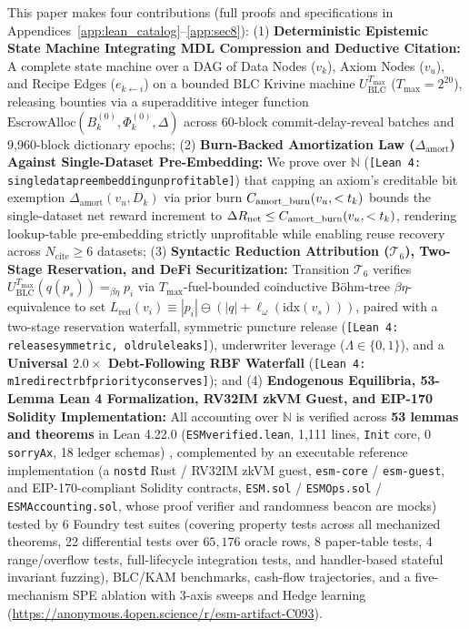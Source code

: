 \documentclass[runningheads,a4paper]{llncs}
\makeatletter
\renewcommand{\_}{\textunderscore\allowbreak}
\newcommand{\leanref}[1]{{\footnotesize\texttt{[Lean 4: #1]}}}
\renewcommand\subsection{\@startsection{subsection}{2}{\z@}{-13\p@ \@plus -4\p@ \@minus -4\p@}{5\p@ \@plus 2\p@ \@minus 2\p@}{\normalfont\normalsize\bfseries\boldmath\rightskip=\z@ \@plus 8em\pretolerance=10000 }}
\makeatother
\begin{document}
\subsection{Core Contributions}
This paper makes four contributions (full proofs and specifications in Appendices~\ref{app:lean_catalog}--\ref{app:sec8}): (1) \textbf{Deterministic Epistemic State Machine Integrating MDL Compression and Deductive Citation:} A complete state machine over a DAG of Data Nodes ($v_k$), Axiom Nodes ($v_u$), and Recipe Edges ($e_{k \leftarrow i}$) on a bounded BLC Krivine machine $U_{\text{BLC}}^{T_{\max}}$ ($T_{\max} = 2^{20}$), releasing bounties via a superadditive integer function $\text{EscrowAlloc}(B_k^{(0)},\allowbreak \Phi_k^{(0)},\allowbreak \Delta)$ across 60-block commit-delay-reveal batches and 9,960-block dictionary epochs; (2) \textbf{Burn-Backed Amortization Law ($\Delta_{\text{amort}}$) Against Single-Dataset Pre-Embedding:} We prove over $\mathbb{N}$ (\leanref{single\_data\_pre\_embedding\_unprofitable}) that capping an axiom's creditable bit exemption $\Delta_{\text{amort}}(v_u,\allowbreak D_k)$ via prior burn $C_{\text{amort\_burn}}(v_u,\allowbreak < t_k)$ bounds the single-dataset net reward increment to $\Delta R_{\text{net}} \le C_{\text{amort\_burn}}(v_u,\allowbreak < t_k)$, rendering lookup-table pre-embedding strictly unprofitable while enabling reuse recovery across $N_{\text{cite}} \ge 6$ datasets; (3) \textbf{Syntactic Reduction Attribution ($\mathcal{T}_6$), Two-Stage Reservation, and DeFi Securitization:} Transition $\mathcal{T}_6$ verifies $U_{\text{BLC}}^{T_{\max}}(q(p_s)) =_{\beta\eta} p_i$ via $T_{\max}$-fuel-bounded coinductive B\"ohm-tree $\beta\eta$-equivalence to set $L_{\text{red}}(v_i) \equiv |p_i| \ominus (|q| + \ell_\omega(\text{idx}(v_s)))$, paired with a two-stage reservation waterfall, symmetric puncture release (\leanref{release\_symmetric, old\_rule\_leaks}), underwriter leverage ($\Lambda \in \{0,1\}$), and a \textbf{Universal $2.0\times$ Debt-Following RBF Waterfall} (\leanref{m1\_redirect\_rbf\_priority\_conserves}); and (4) \textbf{Endogenous Equilibria, 53-Lemma Lean 4 Formalization, RV32IM zkVM Guest, and EIP-170 Solidity Implementation:} All accounting over $\mathbb{N}$ is verified across \textbf{53 lemmas and theorems} in Lean 4.22.0 (\texttt{ESM\_verified.lean}, 1,111 lines, \texttt{Init} core, 0 \texttt{sorryAx}, 18 ledger schemas) \cite{moura2021}, complemented by an executable reference implementation (a \texttt{no\_std} Rust / RV32IM zkVM guest, \texttt{esm-core} / \texttt{esm-guest}, and EIP-170-compliant Solidity contracts, \texttt{ESM.sol} / \texttt{ESMOps.sol} / \texttt{ESMAccounting.sol}, whose proof verifier and randomness beacon are mocks) tested by 6 Foundry test suites (covering property tests across all mechanized theorems, 22 differential tests over $65{,}176$ oracle rows, 8 paper-table tests, 4 range/overflow tests, full-lifecycle integration tests, and handler-based stateful invariant fuzzing), BLC/KAM benchmarks, cash-flow trajectories, and a five-mechanism SPE ablation with 3-axis sweeps and Hedge learning (\url{https://anonymous.4open.science/r/esm-artifact-C093}).
\end{document}
